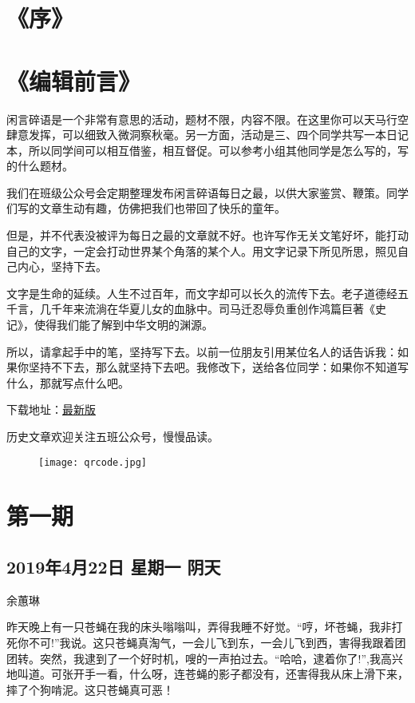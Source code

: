 \chapter*{《序》}
\chapter*{《编辑前言》}
闲言碎语是一个非常有意思的活动，题材不限，内容不限。在这里你可以天马行空肆意发挥，可以细致入微洞察秋毫。另一方面，活动是三、四个同学共写一本日记本，所以同学间可以相互借鉴，相互督促。可以参考小组其他同学是怎么写的，写的什么题材。

我们在班级公众号会定期整理发布闲言碎语每日之最，以供大家鉴赏、鞭策。同学们写的文章生动有趣，仿佛把我们也带回了快乐的童年。

但是，并不代表没被评为每日之最的文章就不好。也许写作无关文笔好坏，能打动自己的文字，一定会打动世界某个角落的某个人。用文字记录下所见所思，照见自己内心，坚持下去。

文字是生命的延续。人生不过百年，而文字却可以长久的流传下去。老子道德经五千言，几千年来流淌在华夏儿女的血脉中。司马迁忍辱负重创作鸿篇巨著《史记》，使得我们能了解到中华文明的渊源。

所以，请拿起手中的笔，坚持写下去。以前一位朋友引用某位名人的话告诉我：如果你坚持不下去，那么就坚持下去吧。我修改下，送给各位同学：如果你不知道写什么，那就写点什么吧。

下载地址：\href{https://github.com/mekesim/2016-Class-5/releases/latest}{最新版}

历史文章欢迎关注五班公众号，慢慢品读。

\begin{figure}[htbp]
	\centering
	\texttt{[image: qrcode.jpg]}
\end{figure}

\chapter{第一期}

\section{2019年4月22日 星期一 阴天}

余蕙琳

昨天晚上有一只苍蝇在我的床头嗡嗡叫，弄得我睡不好觉。``哼，坏苍蝇，我非打死你不可!''我说。这只苍蝇真淘气，一会儿飞到东，一会儿飞到西，害得我跟着团团转。突然，我逮到了一个好时机，嗖的一声拍过去。``哈哈，逮着你了!'',我高兴地叫道。可张开手一看，什么呀，连苍蝇的影子都没有，还害得我从床上滑下来，摔了个狗啃泥。这只苍蝇真可恶！

